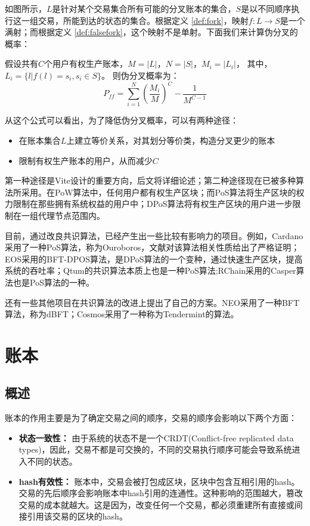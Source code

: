 \documentclass[UTF8,nofonts]{ctexart}
\begin{document}
\begin{multicols}{2}
如图所示，$L$是针对某个交易集合所有可能的分叉账本的集合，$S$是以不同顺序执行这一组交易，所能到达的状态的集合。根据定义 \ref{def:fork}，映射$f: L \rightarrow S$是一个满射；而根据定义 \ref{def:falsefork}，这个映射不是单射。下面我们来计算伪分叉的概率：

假设共有$C$个用户有权生产账本，$M = \vert L \vert$，$N = \vert S \vert$，$M_{i} = \vert L_{i} \vert$， 其中，$L_{i} = \lbrace l \vert f(l) = s_{i}, s_{i} \in S \rbrace$。
则伪分叉概率为：
\begin{equation}
P_{ff} = \sum_{i=1}^{N}\left ( \frac{M_{i}}{M} \right )^{C} - \frac{1}{M^{C-1}}
\end{equation}

从这个公式可以看出，为了降低伪分叉概率，可以有两种途径：
\begin{itemize}
	\item 在账本集合$L$上建立等价关系，对其划分等价类，构造分叉更少的账本
	\item 限制有权生产账本的用户，从而减少$C$
\end{itemize}

第一种途径是Vite设计的重要方向，后文将详细论述；第二种途径现在已被多种算法所采用。在PoW算法中，任何用户都有权生产区块；而PoS算法将生产区块的权力限制在那些拥有系统权益的用户中；DPoS算法\cite{dpos}将有权生产区块的用户进一步限制在一组代理节点范围内。
	
目前，通过改良共识算法，已经产生出一些比较有影响力的项目。例如，Cardano采用了一种PoS算法，称为Ouroboros，文献\cite{bernardo2017ouroboros}对该算法相关性质给出了严格证明；EOS\cite{eos}采用的BFT-DPOS算法，是DPoS算法的一个变种，通过快速生产区块，提高系统的吞吐率；Qtum\cite{dai2017smart}的共识算法本质上也是一种PoS算法;RChain\cite{rchain}采用的Casper算法也是PoS算法的一种。

还有一些其他项目在共识算法的改进上提出了自己的方案。NEO\cite{neo}采用了一种BFT算法，称为dBFT；Cosmos\cite{cosmos}采用了一种称为Tendermint\cite{tendermint}的算法。

\section{账本}
\subsection{概述}
账本的作用主要是为了确定交易之间的顺序，交易的顺序会影响以下两个方面：
\begin{itemize}
	\item \textbf{状态一致性：} 由于系统的状态不是一个CRDT(Conflict-free replicated data types)\cite{crdt}，因此，交易不都是可交换的，不同的交易执行顺序可能会导致系统进入不同的状态。
	\item \textbf{hash有效性：} 账本中，交易会被打包成区块，区块中包含互相引用的hash。交易的先后顺序会影响账本中hash引用的连通性。这种影响的范围越大，篡改交易的成本就越大。这是因为，改变任何一个交易，都必须重建所有直接或间接引用该交易的区块的hash。
\end{itemize}


\end{multicols}
\end{document}
